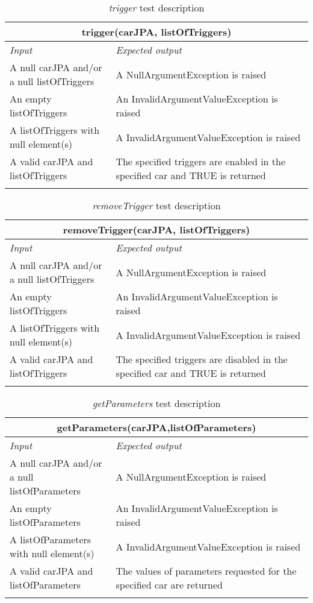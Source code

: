 \begin{longtable}{p{0.35\linewidth}p{0.65\linewidth}}
\multicolumn{2}{c}{\textbf{trigger(carJPA, listOfTriggers)}} \\
\toprule
\emph{Input} & \emph{Expected output} \\
\midrule
A null carJPA and/or a null listOfTriggers & A NullArgumentException is raised\\
\midrule
An empty listOfTriggers & An InvalidArgumentValueException is raised \\
\midrule
A listOfTriggers with null element(s) & A InvalidArgumentValueException is raised\\
\midrule
A valid carJPA and listOfTriggers & The specified triggers are enabled in the specified car and TRUE is returned\\
\bottomrule
\caption{\label{tbl:trigger}\emph{trigger} test description}
\end{longtable}


\begin{longtable}{p{0.35\linewidth}p{0.65\linewidth}}
\multicolumn{2}{c}{\textbf{removeTrigger(carJPA, listOfTriggers)}} \\
\toprule
\emph{Input} & \emph{Expected output} \\
\midrule
A null carJPA and/or a null listOfTriggers & A NullArgumentException is raised\\
\midrule
An empty listOfTriggers & An InvalidArgumentValueException is raised \\
\midrule
A listOfTriggers with null element(s) & A InvalidArgumentValueException is raised\\
\midrule
A valid carJPA and listOfTriggers & The specified triggers are disabled in the specified car and TRUE is returned \\
\bottomrule
\caption{\emph{removeTrigger} test description}
\end{longtable}

\begin{longtable}{p{0.35\linewidth}p{0.65\linewidth}}
\multicolumn{2}{c}{\textbf{getParameters(carJPA,listOfParameters)}} \\
\toprule
\emph{Input} & \emph{Expected output} \\
\midrule
A null carJPA and/or a null listOfParameters & A NullArgumentException is raised\\
\midrule
An empty listOfParameters & An InvalidArgumentValueException is raised \\
\midrule
A listOfParameters with null element(s) & A InvalidArgumentValueException is raised\\
\midrule
A valid carJPA and listOfParameters & The values of parameters requested for the specified car are returned \\
\bottomrule
\caption{\emph{getParameters} test description}
\end{longtable}

